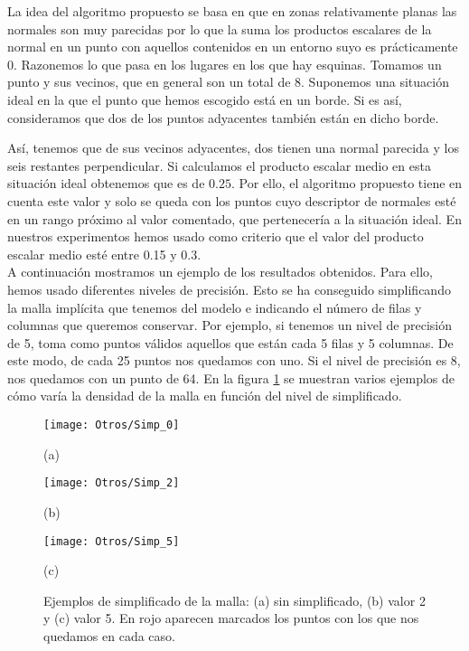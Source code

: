 La idea del algoritmo propuesto se basa en que en zonas relativamente planas las normales son muy parecidas por lo que la suma los productos escalares de la normal en un punto con aquellos contenidos en un entorno suyo es prácticamente 0. Razonemos lo que pasa en los lugares en los que hay esquinas. Tomamos un punto y sus vecinos, que en general son un total de 8. Suponemos una situación ideal en la que el punto que hemos escogido está en un borde. Si es así, consideramos que dos de los puntos adyacentes también están en dicho borde. \begin{comment}
INCLUIR DIBUJO !!!!!!!!!!!!!!!11
\end{comment} 
Así, tenemos que de sus vecinos adyacentes, dos tienen una normal parecida y los seis restantes perpendicular. Si calculamos el producto escalar medio en esta situación ideal obtenemos que es de $ 0.25 $. Por ello, el algoritmo propuesto tiene en cuenta este valor y solo se queda con los puntos cuyo descriptor de normales esté en un rango próximo al valor comentado, que pertenecería a la situación ideal. En nuestros experimentos hemos usado como criterio que el valor del producto escalar medio esté entre 0.15 y 0.3. \\

A continuación mostramos un ejemplo de los resultados obtenidos. Para ello, hemos usado diferentes niveles de precisión. Esto se ha conseguido simplificando la malla implícita que tenemos del modelo e indicando el número de filas y columnas que queremos conservar. Por ejemplo, si tenemos un nivel de precisión de 5, toma como puntos válidos aquellos que están cada 5 filas y 5 columnas. De este modo, de cada 25 puntos nos quedamos con uno. Si el nivel de precisión es 8, nos quedamos con un punto de 64. En la figura \ref{Ej_simpli} se muestran varios ejemplos de cómo varía la densidad de la malla en función del nivel de simplificado.
\begin{figure}[h!]
	\centering
	\begin{minipage}[b]{0.45\textwidth}
		\centering
		\texttt{[image: Otros/Simp\_0]}
		\caption*{(a)}
	\end{minipage}
	\begin{minipage}[b]{0.45\textwidth}
		\centering
		\texttt{[image: Otros/Simp\_2]}
		\caption*{(b)}
	\end{minipage}
	\begin{minipage}[b]{0.45\textwidth}
		\centering
		\texttt{[image: Otros/Simp\_5]}
		\caption*{(c)}
	\end{minipage}
	\caption{Ejemplos de simplificado de la malla: (a) sin simplificado, (b) valor 2 y (c) valor 5. En rojo aparecen marcados los puntos con los que nos quedamos en cada caso.}
	\label{Ej_simpli}
\end{figure}

